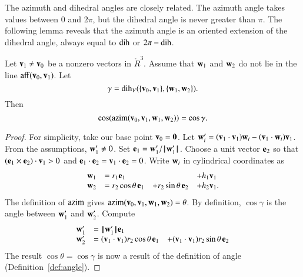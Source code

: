 
The azimuth and dihedral angles are closely related.   
The azimuth angle takes values between $0$ and $2\pi$, but the dihedral
angle is never greater than $\pi$.  The following lemma reveals that
the azimuth angle is an oriented extension of the dihedral angle, always
equal to $\operatorname{dih}$ or $2\pi - \operatorname{dih}$.
%
%
%
%

\begin{lemma}\label{lemma:dih-azim}
Let ${\mathbf v}_1\ne {\mathbf v}_0$ be a nonzero vectors in $\ring{R}^3$.
  Assume that ${\mathbf w}_1$ and ${\mathbf w}_2$ do not lie in the line ${\operatorname{aff}}({\mathbf v}_0,{\mathbf v}_1)$.
Let
  $$\gamma = \operatorname{dih}_V(\{{\mathbf v}_0,{\mathbf v}_1\},\{{\mathbf w}_1,{\mathbf w}_2\}).$$
  Then
    $$
    \cos({\operatorname{azim}}({\mathbf v}_0,{\mathbf v}_1,{\mathbf w}_1,{\mathbf w}_2)) = \cos\gamma.
    $$
\end{lemma}

\begin{proof}  For simplicity,  take our base point ${\mathbf v}_0={\mathbf 0}$.
Let ${\mathbf w}_i' = ({\mathbf v}_1\cdot {\mathbf v}_1) {\mathbf w}_i - ({\mathbf v}_1\cdot {\mathbf w}_i) {\mathbf v}_1$.  
From the assumptions, ${\mathbf w}_1'\ne 0$.  Set ${\mathbf e}_1 = {\mathbf w}_1'/{{\hskip0.1em|\hskip-0.15em|\hskip0.1em}{\mathbf w}_1'{\hskip0.1em|\hskip-0.15em|\hskip0.1em}}$.  Choose a unit vector
${\mathbf e}_2$ so that $({\mathbf e}_1\times {\mathbf e}_2)\cdot{\mathbf v}_1>0$ and ${\mathbf e}_1\cdot {\mathbf e}_2 = {\mathbf v}_1\cdot {\mathbf e}_2=0$.
Write ${\mathbf w}_i$ in cylindrical coordinates as 
   $$
   \begin{array}{lllll}
     {\mathbf w}_1 &= r_1 {\mathbf e}_1 &    &+h_1 {\mathbf v}_1\\
     {\mathbf w}_2 &= r_2 \cos\theta\, {\mathbf e}_1 &+ r_2 \sin\theta\, {\mathbf e}_2 &+ h_2 {\mathbf v}_1.
    \end{array}
   $$
The definition of ${\operatorname{azim}}$ gives ${\operatorname{azim}}({\mathbf v}_0,{\mathbf v}_1,{\mathbf w}_1,{\mathbf w}_2)=\theta$.  
By definition, $\cos\gamma$ is the angle between ${\mathbf w}_1'$ and ${\mathbf w}_2'$.
Compute
   $$
   \begin{array}{lll}
     {\mathbf w}_1' &= {{\hskip0.1em|\hskip-0.15em|\hskip0.1em}{\mathbf w}_1'{\hskip0.1em|\hskip-0.15em|\hskip0.1em}} {\mathbf e}_1 \\
     {\mathbf w}_2' &= ({\mathbf v}_1\cdot {\mathbf v}_1) r_2 \cos\theta\, {\mathbf e}_1 
       &+ ({\mathbf v}_1\cdot {\mathbf v}_1) r_2 \sin\theta\, {\mathbf e}_2 \\
     \end{array}
   $$
The result $\cos\theta=\cos\gamma$ 
is now a result of the definition of angle 
(Definition~\ref{def:angle}).
\end{proof}
%
%

